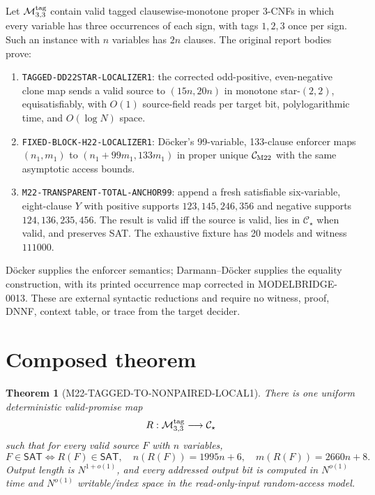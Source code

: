 \documentclass[11pt]{article}
\newtheorem{theorem}{Theorem}
\begin{document}
Let $\mathcal M_{3,3}^{\rm tag}$ contain valid tagged clausewise-monotone
proper 3-CNFs in which every variable has three occurrences of each sign,
with tags $1,2,3$ once per sign.  Such an instance with $n$ variables has
$2n$ clauses.  The original report bodies prove:
\begin{enumerate}
\item \texttt{TAGGED-DD22STAR-LOCALIZER1}: the corrected odd-positive,
even-negative clone map sends a valid source to $(15n,20n)$ in monotone
star-$(2,2)$, equisatisfiably, with $O(1)$ source-field reads per target bit,
polylogarithmic time, and $O(\log N)$ space.
\item \texttt{FIXED-BLOCK-H22-LOCALIZER1}: D\"ocker's 99-variable,
133-clause enforcer maps $(n_1,m_1)$ to
$(n_1+99m_1,133m_1)$ in proper unique $\mathcal C_{\rm M22}$ with the same
asymptotic access bounds.
\item \texttt{M22-TRANSPARENT-TOTAL-ANCHOR99}: append a fresh satisfiable
six-variable, eight-clause $Y$ with positive supports
$123,145,246,356$ and negative supports $124,136,235,456$.  The result is
valid iff the source is valid, lies in $\mathcal C_\star$ when valid, and
preserves SAT.  The exhaustive fixture has 20 models and witness $111000$.
\end{enumerate}

D\"ocker supplies the enforcer semantics; Darmann--D\"ocker supplies the
equality construction, with its printed occurrence map corrected in
MODELBRIDGE-0013.  These are external syntactic reductions and require no
witness, proof, DNNF, context table, or trace from the target decider.

\section{Composed theorem}

\begin{theorem}[M22-TAGGED-TO-NONPAIRED-LOCAL1]
There is one uniform deterministic valid-promise map
\[
R:\mathcal M_{3,3}^{\rm tag}\longrightarrow\mathcal C_\star
\]
such that for every valid source $F$ with $n$ variables,
\[
F\in\mathsf{SAT}\Longleftrightarrow R(F)\in\mathsf{SAT},\quad
n(R(F))=1995n+6,\quad m(R(F))=2660n+8.
\]
Output length is $N^{1+o(1)}$, and every addressed output bit is computed in
$N^{o(1)}$ time and $N^{o(1)}$ writable/index space in the read-only-input
random-access model.
\end{theorem}
\end{document}

